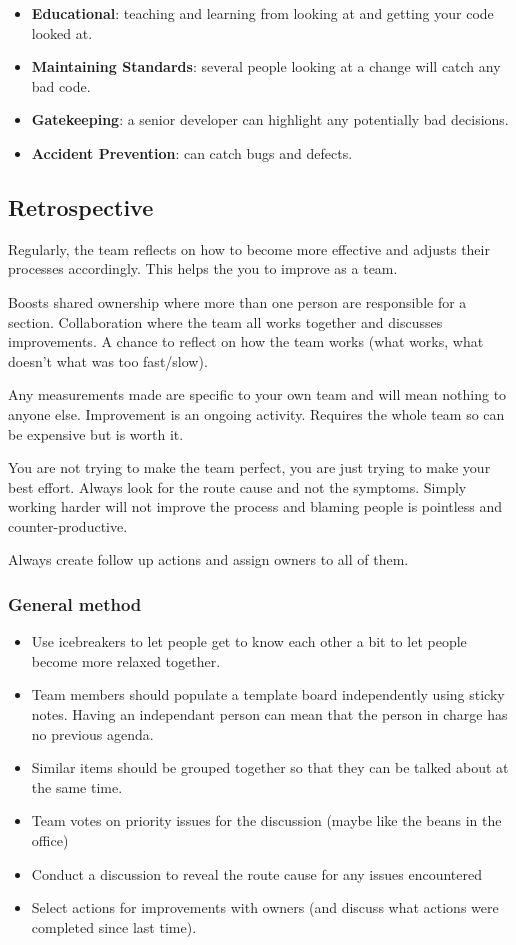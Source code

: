 \begin{itemize}
	\item \textbf{Educational}: teaching and learning from looking at and getting your code looked at.
	\item \textbf{Maintaining Standards}: several people looking at a change will catch any bad code.
	\item \textbf{Gatekeeping}: a senior developer can highlight any potentially bad decisions.
	\item \textbf{Accident Prevention}: can catch bugs and defects.
\end{itemize}

\subsection{Retrospective}\label{sub:retrospective}

Regularly, the team reflects on how to become more effective and adjusts their processes accordingly.
This helps the you to improve as a team.

Boosts shared ownership where more than one person are responsible for a section.
Collaboration where the team all works together and discusses improvements.
A chance to reflect on how the team works (what works, what doesn't what was too fast/slow).

Any measurements made are specific to your own team and will mean nothing to anyone else.
Improvement is an ongoing activity.
Requires the whole team so can be expensive but is worth it.

You are not trying to make the team perfect, you are just trying to make your best effort.
Always look for the route cause and not the symptoms.
Simply working harder will not improve the process and blaming people is pointless and counter-productive.

Always create follow up actions and assign owners to all of them.

\subsubsection{General method}\label{ssub:general_method}

\begin{itemize}
	\item Use icebreakers to let people get to know each other a bit to let people become more relaxed together.
	\item Team members should populate a template board independently using sticky notes. Having an independant person can mean that the person in charge has no previous agenda.
	\item Similar items should be grouped together so that they can be talked about at the same time.
	\item Team votes on priority issues for the discussion (maybe like the beans in the office)
	\item Conduct a discussion to reveal the route cause for any issues encountered
	\item Select actions for improvements with owners (and discuss what actions were completed since last time).
\end{itemize}

